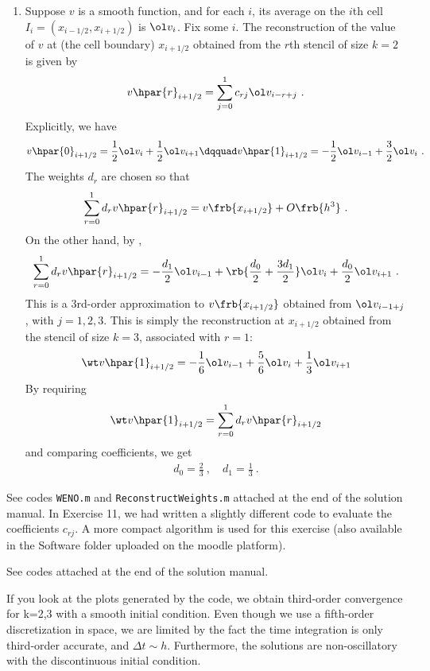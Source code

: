 \documentclass{article}
\begin{document}
\begin{exerciseList}
\begin{enumerate}
\item
Suppose $v$ is a smooth function, and for each $i$, its average on the $i$th cell $I_i=(x_{i-1/2},x_{i+1/2})$ is $\ol v_i$.
Fix some $i$. The reconstruction of the value of $v$ at (the cell boundary) $x_{i+1/2}$ obtained from the $r$th stencil of size $k=2$ is given by
\begin{gather}
	v\hpar{r}_{i+1/2}=\sum_{j=0}^1 c_{rj}\ol v_{i-r+j}\ .
\end{gather}
Explicitly, we have
\begin{gather} \label{Reconk2}
	v\hpar{0}_{i+1/2}=\frac{1}{2}\ol v_{i}+\frac{1}{2}\ol v_{i+1}
	\dqquad
	v\hpar{1}_{i+1/2}=-\frac{1}{2}\ol v_{i-1}+\frac{3}{2}\ol v_{i}\ .
\end{gather}
The weights $d_r$ are chosen so that
\begin{gather}
	\sum_{r=0}^1 d_r v\hpar{r}_{i+1/2}=v\frb{x_{i+1/2}}+O\frb{h^3}\ .
\end{gather}
On the other hand, by ,
\begin{gather}
	\sum_{r=0}^1 d_r v\hpar{r}_{i+1/2}
		=-\frac{d_1}{2}\ol v_{i-1}+\rb{\frac{d_0}{2}+\frac{3d_1}{2}}\ol v_{i}+\frac{d_0}{2}\ol v_{i+1}\ .
\end{gather}
This is a 3rd-order approximation to $v\frb{x_{i+1/2}}$ obtained from $\ol v_{i-1+j}$, with $j=1,2,3$.
This is simply the reconstruction at $x_{i+1/2}$ obtained from the stencil of size $k=3$, associated with $r=1$:
\begin{gather}
	\wt v\hpar{1}_{i+1/2}=-\frac{1}{6}\ol v_{i-1}+\frac{5}{6}\ol v_{i} +\frac{1}{3}\ol v_{i+1}
\end{gather}
By requiring
\begin{gather}
	\wt v\hpar{1}_{i+1/2}=\sum_{r=0}^1 d_r v\hpar{r}_{i+1/2}
\end{gather}
and comparing coefficients, we get
\begin{gather}
	d_0=\frac{2}{3}\ ,
	\quad
	d_1=\frac{1}{3}\ .
\end{gather}


\end{enumerate}

\item See codes {\tt WENO.m} and {\tt ReconstructWeights.m} attached at the end of the solution manual. In Exercise 11, we had written a slightly different code to evaluate the coefficients $c_{rj}$. A more compact algorithm is used for this exercise (also available in the Software folder uploaded on the moodle platform).

\item See codes attached at the end of the solution manual.

\item If you look at the plots generated by the code, we obtain third-order convergence for k=2,3 with a smooth initial condition. Even though we use a fifth-order discretization in space, we are limited by the fact the time integration is only third-order accurate, and $\Delta t \sim h$. Furthermore, the solutions are non-oscillatory with the discontinuous initial condition.

\end{exerciseList}
\end{document}
